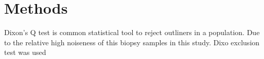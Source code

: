 \chapter{Methods}

Dixon's Q test is common statistical tool to reject outliners in a population. Due to the relative high noiseness of this biopsy samples in this study. Dixo  exclusion test was used 